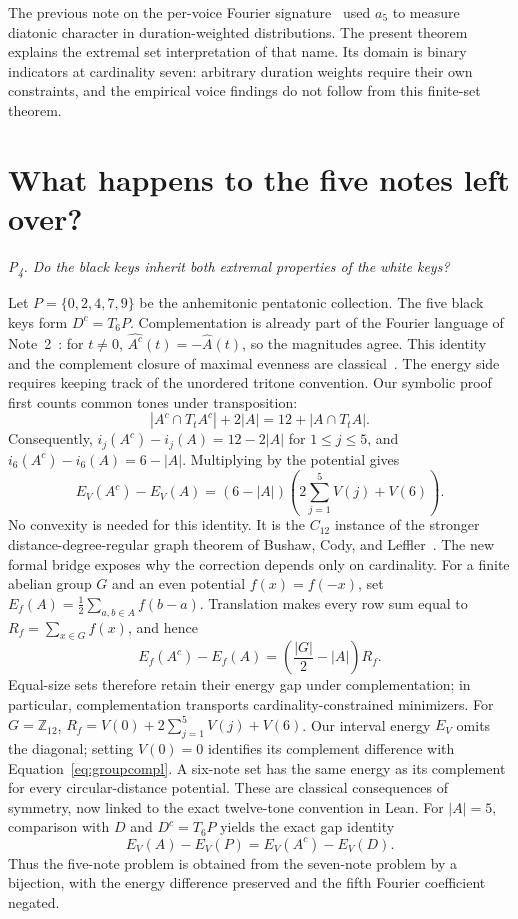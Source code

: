 \documentclass[11pt]{article}
\newcommand{\Ztwelve}{\mathbb{Z}_{12}}
\newcommand{\Ahat}{\widehat A}
\newcommand{\question}[1]{\smallskip\noindent\textit{#1}\smallskip}
\begin{document}
The previous note on the per-voice Fourier signature~\cite{Voice} used $a_5$ to measure
diatonic character in duration-weighted distributions. The present theorem explains the
extremal set interpretation of that name. Its domain is binary indicators at cardinality
seven: arbitrary duration weights require their own constraints, and the empirical
voice findings do not follow from this finite-set theorem.

\section{What happens to the five notes left over?}\label{sec:complements}

\question{P\textsubscript{4}. Do the black keys inherit both extremal properties of the white keys?}

Let $P=\{0,2,4,7,9\}$ be the anhemitonic pentatonic collection. The five black keys form
$D^c=T_6P$. Complementation is already part of the Fourier language of Note~2~\cite{Phase}:
for $t\ne0$, $\widehat{A^c}(t)=-\Ahat(t)$, so the magnitudes agree. This identity and the
complement closure of maximal evenness are classical~\cite{Amiot2006}.
The energy side requires keeping track of the unordered tritone convention. Our symbolic
proof first counts common tones under transposition:
\[
 |A^c\cap T_tA^c|+2|A|=12+|A\cap T_tA|.
\]
Consequently, $i_j(A^c)-i_j(A)=12-2|A|$ for $1\le j\le5$, and
$i_6(A^c)-i_6(A)=6-|A|$. Multiplying by the potential gives
\begin{equation}\label{eq:complenergy}
 E_V(A^c)-E_V(A)=(6-|A|)\left(2\sum_{j=1}^5V(j)+V(6)\right).
\end{equation}
No convexity is needed for this identity. It is the $C_{12}$ instance of the stronger
distance-degree-regular graph theorem of Bushaw, Cody, and Leffler~\cite[Theorem~3.5]{BCL}.
The new formal bridge exposes why the correction depends only on cardinality.
For a finite abelian group $G$ and an even potential $f(x)=f(-x)$, set
$E_f(A)=\frac12\sum_{a,b\in A}f(b-a)$. Translation makes every row sum equal to
$R_f=\sum_{x\in G}f(x)$, and hence
\begin{equation}\label{eq:groupcompl}
 E_f(A^c)-E_f(A)=\left(\frac{|G|}{2}-|A|\right)R_f.
\end{equation}
Equal-size sets therefore retain their energy gap under complementation; in particular,
complementation transports cardinality-constrained minimizers. For $G=\Ztwelve$,
$R_f=V(0)+2\sum_{j=1}^5V(j)+V(6)$. Our interval energy $E_V$ omits the diagonal;
setting $V(0)=0$ identifies its complement difference with
Equation~\eqref{eq:groupcompl}. A six-note set has the same energy as its complement
for every circular-distance potential. These are classical consequences of symmetry,
now linked to the exact twelve-tone convention in Lean.
For $|A|=5$, comparison with $D$ and $D^c=T_6P$ yields the exact gap identity
\[
 E_V(A)-E_V(P)=E_V(A^c)-E_V(D).
\]
Thus the five-note problem is obtained from the seven-note problem by a bijection,
with the energy difference preserved and the fifth Fourier coefficient negated.
\end{document}
